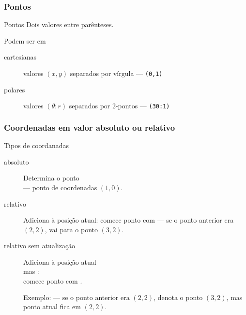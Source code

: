 \begin{frame}
  \frametitle{Pontos}

  \begin{block}{Pontos}
    Dois valores entre parênteses.
  \end{block}
\bigskip

  Podem ser em 
  \begin{description}
  \item[cartesianas] valores $(x,y)$ separados por vírgula --- \texttt{(0,1)}
  \item[polares] valores $(\theta:r)$ separados por 2-pontos --- \texttt{(30:1)}
  \end{description}
\end{frame}

\begin{frame}
  \frametitle{Coordenadas em valor absoluto ou relativo}

  \begin{block}{Tipos de coordanadas}
    \begin{description}
    \item[absoluto] Determina o ponto\\
       --- ponto de coordenadas $(1,0)$.
    \item[relativo] Adiciona à posição atual: comece ponto com
      \green{\texttt{++}}
       --- se o ponto anterior era $(2,2)$, vai
      para o ponto $(3,2)$.

    \item[relativo sem atualização] Adiciona à posição atual\\
      mas :\\ comece ponto com \green{\texttt{+}}.

      Exemplo:  --- se o ponto anterior era
      $(2,2)$, denota o ponto $(3,2)$, mas ponto atual fica em
      $(2,2)$.
    \end{description}
  \end{block}

\end{frame}

